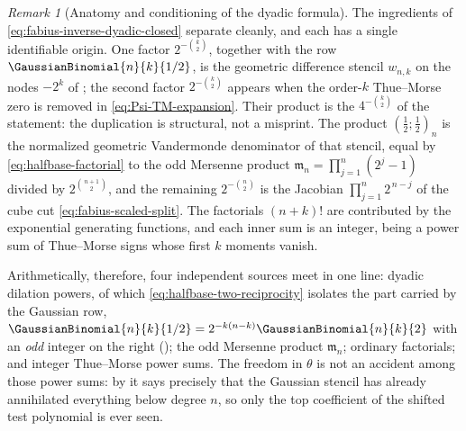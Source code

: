 \documentclass[11pt,a4paper,oneside,openany]{book}
\theoremstyle{definition}
\theoremstyle{remark}
\newtheorem{remark}[remark]{Remark}
\begin{document}
\begin{remark}[Anatomy and conditioning of the dyadic formula]\label{rem:dyadic-formula-anatomy}
The ingredients of \eqref{eq:fabius-inverse-dyadic-closed} separate cleanly, and each has a
single identifiable origin.  One factor $2^{-\binom k2}$, together with the row
$\GaussianBinomial{n}{k}{1/2}$, is the geometric difference stencil $w_{n,k}$ on the nodes $-2^{k}$ of
; the second factor $2^{-\binom k2}$ appears when the order-$k$
Thue--Morse zero is removed in \eqref{eq:Psi-TM-expansion}.  Their product is the
$4^{-\binom k2}$ of the statement: the duplication is structural, not a misprint.  The
product $\left(\tfrac12;\tfrac12\right)_n$ is the normalized geometric Vandermonde
denominator of that stencil, equal by \eqref{eq:halfbase-factorial} to the odd Mersenne
product $\mathfrak m_n=\prod_{j=1}^{n}(2^{j}-1)$ divided by $2^{\binom{n+1}{2}}$, and the
remaining $2^{-\binom n2}$ is the Jacobian $\prod_{j=1}^{n}2^{\,n-j}$ of the cube cut
\eqref{eq:fabius-scaled-split}.  The factorials $(n+k)!$ are contributed by the
exponential generating functions, and each inner sum is an integer, being a power sum of
Thue--Morse signs whose first $k$ moments vanish.

Arithmetically, therefore, four independent sources meet in one line: dyadic dilation
powers, of which \eqref{eq:halfbase-two-reciprocity} isolates the part carried by the
Gaussian row, $\GaussianBinomial{n}{k}{1/2}=2^{-k(n-k)}\GaussianBinomial{n}{k}{2}$ with an \emph{odd} integer on the
right (); the odd Mersenne product $\mathfrak m_n$;
ordinary factorials; and integer Thue--Morse power sums.  The freedom in $\theta$ is not
an accident among those power sums: by  it says precisely
that the Gaussian stencil has already annihilated everything below degree $n$, so only
the top coefficient of the shifted test polynomial is ever seen.


\end{remark}
\end{document}
